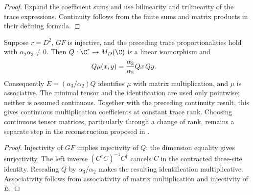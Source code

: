 \begin{proof}\leanok
    Expand the coefficient sums and use bilinearity and trilinearity
    of the trace expressions. Continuity follows from the finite sums
    and matrix products in their defining formula.
\end{proof}

\begin{lemma}
    \label{thm:spt_trace_quotient_matrix_algebra_recovery}
    \leanok
    Suppose $r=D^2$, $GF$ is injective, and the preceding trace
    proportionalities hold with $\alpha_2\alpha_3\ne0$.
    Then $Q:\C^r\to M_D(\C)$ is a linear isomorphism and
    \begin{align}
        Q\mu(x,y) & =\frac{\alpha_3}{\alpha_2}Qx\,Qy.
        \notag
    \end{align}
    Consequently $E=(\alpha_3/\alpha_2)Q$ identifies $\mu$ with
    matrix multiplication, and $\mu$ is associative.
    The minimal tensor and the identification are used only pointwise;
    neither is assumed continuous. Together with the preceding
    continuity result, this gives continuous multiplication coefficients
    at constant trace rank. Choosing continuous tensor matrices,
    particularly through a change of rank, remains a separate step in
    the reconstruction proposed in
    \cite[Section~II.F.2, lines~953--993]{Schuch2011Phases}.
\end{lemma}

\begin{proof}\leanok
    Injectivity of $GF$ implies injectivity of $Q$; the dimension
    equality gives surjectivity. The left inverse
    $(C^\dagger C)^{-1}C^\dagger$ cancels $C$ in the contracted
    three-site identity. Rescaling $Q$ by $\alpha_3/\alpha_2$ makes
    the resulting identification multiplicative. Associativity follows
    from associativity of matrix multiplication and injectivity of $E$.
\end{proof}

